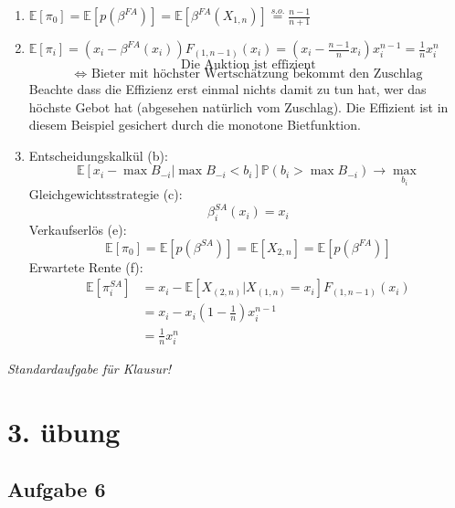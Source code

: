 \documentclass[12pt]{extreport} %
\theoremstyle{named}
\theoremstyle{nnamed}
\theoremstyle{itshape}
\theoremstyle{normal}
\begin{document}
\begin{enumerate}
		\begin{proof}
			 $$ \mathds{E}\left[ X_{(2,n)} \right] = \frac{n-2+1}{n-1} = \frac{n-1}{n+1} $$ 
			 $$ \mathds{E}\left[ \beta^{FA}(X_{1,n}) \right] = \mathds{E}\left[ \left( 1 - \frac{1}{n} \right) X_{1,n} \right] = \left( 1 - \frac{1}{n} \right) \frac{n}{n+1} = \frac{n-1}{n+1} $$
		\end{proof}
	\item $\mathds{E}\left[ \pi_0 \right] = \mathds{E}\left[ p \left( \beta^{FA} \right) \right] = \mathds{E}\left[ \beta^{FA} \left( X_{1,n} \right) \right] \overset{s.o.}{=} \frac{n-1}{n+1}$ 
	\item $\mathds{E}\left[ \pi_i \right] = \left( x_i - \beta^{FA}(x_i) \right) F_{(1,n-1)}(x_{i}) = \left( x_i - \frac{n-1}{n} x_i \right) x_i^{n-1} = \frac{1}{n} x_i^n$ ~\\
		$$ \text{Die Auktion ist effizient} $$ 
		$$ \iff \text{ Bieter mit höchster Wertschätzung bekommt den Zuschlag} $$
		Beachte dass die Effizienz erst einmal nichts damit zu tun hat, wer das höchste Gebot hat (abgesehen natürlich vom Zuschlag). Die Effizient ist in diesem Beispiel gesichert durch die monotone Bietfunktion.
	\item Entscheidungskalkül (b):
		$$ \mathds{E} \left[ x_i - \max B_{-i} \big| \max B_{-i} < b_{i} \right] \mathds{P} \left( b_i > \max B_{-i} \right) \longrightarrow \max_{b_i} $$
		Gleichgewichtsstrategie (c):
			$$ \beta_i^{SA}(x_i) = x_i $$
		Verkaufserlös (e):
			$$ \mathds{E}[\pi_{0}] = \mathds{E}\left[ p\left( \beta^{SA} \right) \right] = \mathds{E}[ X_{2,n} ] = \mathds{E} \left[ p\left( \beta^{FA} \right) \right] $$
		Erwartete Rente (f):
			\begin{align*}
				\mathds{E}[\pi_i^{SA}] & = x_i - \mathds{E} \left[ X_{(2,n)} \big|  X_{(1,n)} = x_i \right] F_{(1,n-1)}(x_i) \\
				& = x_i - x_i \left( 1 - \frac{1}{n} \right) x_i^{n-1} \\
				& = \frac{1}{n} x_i^n
			\end{align*}
\end{enumerate}

\textit{Standardaufgabe für Klausur!}

\newpage

\section*{3. übung}

\subsection*{Aufgabe 6}
\end{document}
